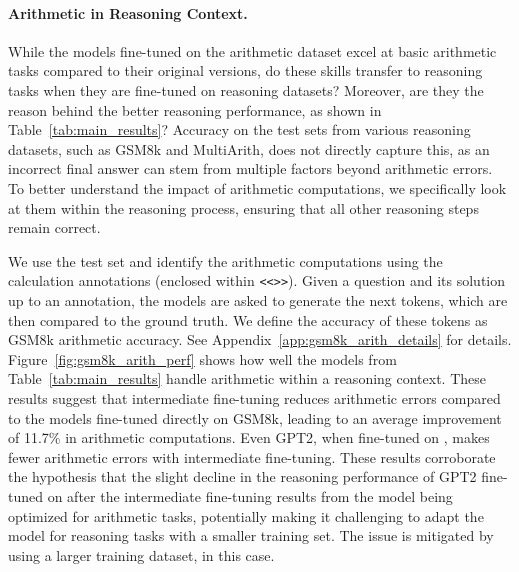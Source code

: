 \paragraph{Arithmetic in Reasoning Context.}
While the models fine-tuned on the arithmetic dataset excel at basic arithmetic tasks compared to their original versions, do these skills transfer to reasoning tasks when they are fine-tuned on reasoning datasets? Moreover, are they the reason behind the better reasoning performance, as shown in Table~\ref{tab:main_results}? Accuracy on the test sets from various reasoning datasets, such as GSM8k and MultiArith, does not directly capture this, as an incorrect final answer can stem from multiple factors beyond arithmetic errors. To better understand the impact of arithmetic computations, we specifically look at them within the reasoning process, ensuring that all other reasoning steps remain correct.



We use the \gsm{} test set and identify the arithmetic computations using the calculation annotations (enclosed within \texttt{<<>>}). Given a question and its solution up to an annotation, the models are asked to generate the next tokens, which are then compared to the ground truth. We define the accuracy of these tokens as GSM8k arithmetic accuracy. See Appendix~\ref{app:gsm8k_arith_details} for details. Figure~\ref{fig:gsm8k_arith_perf} shows how well the models from Table~\ref{tab:main_results} handle arithmetic within a reasoning context. These results suggest that intermediate fine-tuning reduces arithmetic errors compared to the models fine-tuned directly on GSM8k, leading to an average improvement of 11.7\% in arithmetic computations. Even GPT2, when fine-tuned on \gsmo{}, makes fewer arithmetic errors with intermediate fine-tuning. These results corroborate the hypothesis that the slight decline in the reasoning performance of GPT2 fine-tuned on \gsmo{} after the intermediate fine-tuning results from the model being optimized for arithmetic tasks, potentially making it challenging to adapt the model for reasoning tasks with a smaller training set. The issue is mitigated by using a larger training dataset, \gsmd{} in this case.

